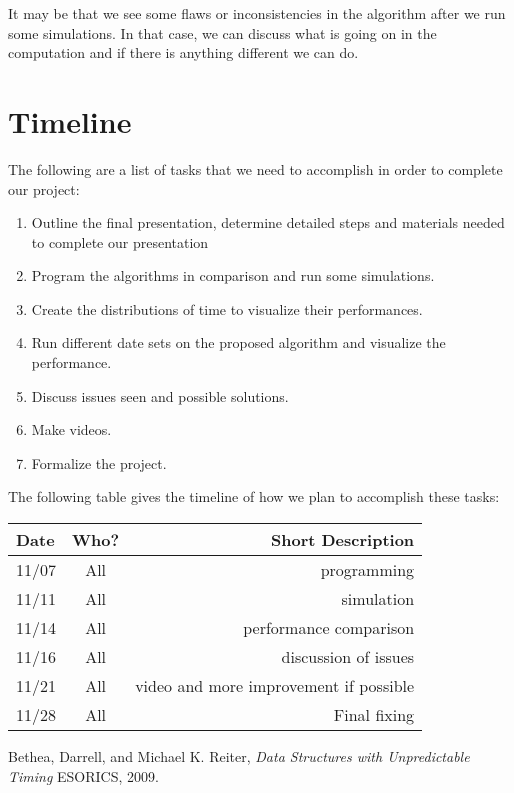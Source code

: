 \documentclass[11pt,twocolumn]{article}
\begin{document}
It may be that we see some flaws or inconsistencies in the algorithm after we run some simulations. In that case, we can discuss what is going on in the computation and if there is anything different we can do.



 

\newpage
\onecolumn
\appendix
\section{Timeline}

The following are a list of tasks that we need to accomplish in order to 
complete our project:

\begin{enumerate}
\item Outline the final presentation, determine detailed steps and
materials needed to complete our presentation

\item Program the algorithms in comparison and run some simulations.

\item Create the distributions of time to visualize their performances.

\item Run different date sets on the proposed algorithm and visualize the performance.

\item Discuss issues seen and possible solutions.

\item Make videos.

\item Formalize the project.
\end{enumerate}

The following table gives the timeline of how we plan to accomplish these tasks:

\begin{table}[h!]
\centering
\begin{tabular}{ |l | c | r|}
  \hline
  Date & Who? & Short Description \\
  \hline
  \hline
  11/07 & All & programming \\
  \hline
  11/11 & All & simulation \\
  
  \hline
  11/14 & All & performance comparison \\
  
  \hline
  11/16 & All & discussion of issues \\
  
  \hline
  11/21 & All & video and more improvement if possible \\
  
 
  \hline
  11/28 & All & Final fixing \\
  \hline
\end{tabular}
\end{table}

\pagebreak

\begin{thebibliography}{9}
	
	Bethea, Darrell, and Michael K. Reiter,
	\emph{Data Structures with Unpredictable Timing}
	ESORICS,
	2009.
	
\end{thebibliography}
\end{document}
